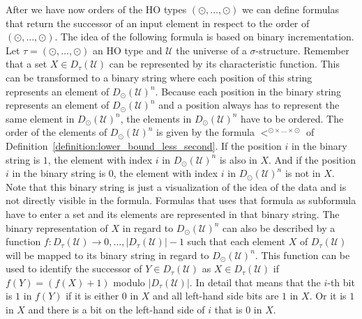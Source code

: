 After we have now orders of the HO types $(\odot, \dots, \odot)$ we can define formulas that return the successor of
an input element in respect to the order of $(\odot, \dots, \odot)$. The idea of the following formula is based on
binary incrementation. Let $\tau = (\odot, \dots, \odot)$ an HO type and $\mathcal{U}$ the universe of a
$\sigma$-structure. Remember that a set $X \in D_\tau(\mathcal{U})$ can be represented by its characteristic
function. This can be transformed to a binary string where each position of this string represents an element of
$D_{\odot}(\mathcal{U})^n$. Because each position in the binary string represents an element of $D_{\odot}
(\mathcal{U})^n$ and a position always has to represent the same element in $D_{\odot}(\mathcal{U})^n$, the elements
in $D_{\odot}(\mathcal{U})^n$ have to be ordered. The order of the elements of $D_{\odot}(\mathcal{U})^n$ is given by
the formula $<^{\odot \times \dots \times \odot}$ of Definition~\ref{definition:lower_bound_less_second}. If the position
$i$ in the binary string is $1$, the element with index $i$ in $D_{\odot}(\mathcal{U})^n$ is
also in $X$. And if the position $i$ in the binary string is $0$, the element with index $i$ in $D_{\odot}
(\mathcal{U})^n$ is not in $X$. Note that this binary string is just a visualization of the idea of the data and is
not directly visible in the formula. Formulas that uses that formula as subformula have to enter a set and its elements are
represented in that binary string. The binary representation of $X$ in regard to $D_{\odot}
(\mathcal{U})^n$ can also be described by a function $f \colon D_\tau(\mathcal{U}) \rightarrow 
{0, \dots, |D_\tau(\mathcal{U})| - 1}$ such that
each element $X$ of $D_\tau(\mathcal{U})$ will be mapped to its binary string in regard to 
$D_{\odot}(\mathcal{U})^n$. This function can be used to identify the successor of $Y \in D_\tau(\mathcal{U})$ as $X \in D_\tau
(\mathcal{U})$ if $f(Y) = (f(X) + 1)$ modulo $|D_\tau(\mathcal{U})|$. In detail that means that the $i$-th bit is $1$
in $f(Y)$ if it is either $0$ in $X$ and all left-hand side bits are $1$ in $X$. Or it is $1$ in $X$ and there is a bit on the left-hand side of $i$ that is $0$ in $X$.

